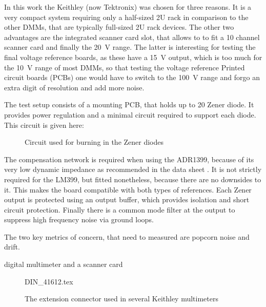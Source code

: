 In this work the Keithley (now Tektronix)  was chosen for three reasons. It is a very compact system requiring only a half-sized 2U rack in comparison to the other DMMs, that are typically full-sized 2U rack devices. The other two advantages are the integrated scanner card slot, that allows to to fit a 10 channel scanner card and finally the \qty{20}{\volt} range. The latter is interesting for testing the final voltage reference boards, as these have a \qty{15}{\volt} output, which is too much for the \qty{10}{\volt} range of most DMMs, so that testing the voltage reference Printed circuit boards
(PCBs) one would have to switch to the \qty{100}{\volt} range and forgo an extra digit of resolution and add more noise.

The test setup consists of a mounting PCB, that holds up to 20 Zener diode. It provides power regulation and a minimal circuit required to support each diode. This circuit is given here:

\begin{figure}[ht]
    \centering
    \caption{Circuit used for burning in the Zener diodes}
\end{figure}

The compensation network is required when using the ADR1399, because of its very low dynamic impedance as recommended in the data sheet \cite{datasheet_ADR1399}. It is not strictly required for the LM399, but fitted nonetheless, because there are no downsides to it. This makes the board compatible with both types of references. Each Zener output is protected using an output buffer, which provides isolation and short circuit protection. Finally there is a common mode filter at the output to suppress high frequency noise via ground loops.

The two key metrics of concern, that need to measured are popcorn noise and drift.

digital multimeter and a scanner card


\begin{figure}[ht]
    \centering
    {DIN_41612.tex}
    \caption{The extension connector used in several Keithley multimeters}
\end{figure}

